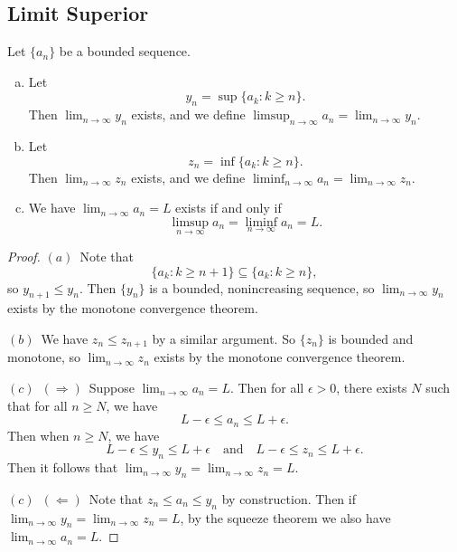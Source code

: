 \subsection{Limit Superior}
\begin{exercise}
  Let $\{a_n\}$ be a bounded sequence.
  \begin{enumerate}[(a)]
    \item Let
    \[
      y_n = \sup\{a_k : k \ge n\}.
    \]
    Then $\lim_{n \to \infty} y_n$ exists, and we define
    $\limsup_{n \to \infty} a_n = \lim_{n \to \infty} y_n$.
  \item Let
    \[z_n = \inf\{a_k : k \ge n\}.\]
    Then $\lim_{n \to \infty} z_n$ exists, and we define
    $\liminf_{n \to \infty} a_n = \lim_{n \to \infty} z_n$.
  \item We have $\lim_{n \to \infty} a_n = L$ exists if and
    only if
    \[\limsup_{n \to \infty} a_n = \liminf_{n \to \infty} a_n = L.\]
  \end{enumerate}
\end{exercise}

\begin{proof}
  $(a)$\, Note that
  \[\{a_k : k \ge n + 1\} \subseteq \{a_k : k \ge n\},\]
  so $y_{n + 1} \le y_n$. Then $\{y_n\}$ is a
  bounded, nonincreasing sequence, so
  $\lim_{n \to \infty} y_n$
  exists by the monotone convergence theorem.

  $(b)$\, We have $z_n \le z_{n + 1}$ by a similar argument.
  So $\{z_n\}$ is bounded and monotone, so
  $\lim_{n \to \infty} z_n$ exists by the monotone convergence
  theorem.

  $(c)$\, $(\Rightarrow)$\,
  Suppose $\lim_{n \to \infty} a_n = L$.
  Then for all $\epsilon > 0$, there exists $N$ such that
  for all $n \ge N$, we have
  \[
    L - \epsilon \le a_n \le L + \epsilon.
  \]
  Then when $n \ge N$, we have
  \[
    L - \epsilon \le y_n \le L + \epsilon \quad \text{and}
    \quad L - \epsilon \le z_n \le L + \epsilon.
  \]
  Then it follows that
  $\lim_{n \to \infty} y_n = \lim_{n \to \infty} z_n = L$.

  $(c)$\, $(\Leftarrow)$\, Note that
  $z_n \le a_n \le y_n$ by construction. Then if
  $\lim_{n \to \infty} y_n = \lim_{n \to \infty} z_n = L$,
  by the squeeze theorem we also have
  $\lim_{n \to \infty} a_n = L$.
\end{proof}
